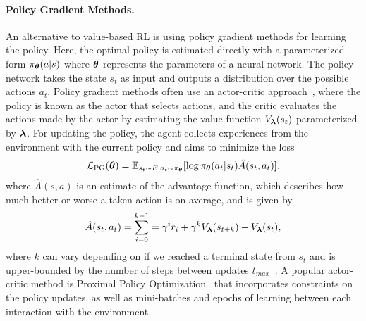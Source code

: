 \paragraph{Policy Gradient Methods.} An alternative to value-based RL is using policy gradient methods for learning the policy. Here, the optimal policy is estimated directly with a parameterized form $\pi_{{\bm{\theta}}}(a | s)$ where ${\bm{\theta}}$ represents the parameters of a neural network. The policy network takes the state $s_t$ as input and outputs a distribution over the possible actions $a_t$. Policy gradient methods often use an actor-critic approach~\cite{sutton2018reinforcement,konda1999actor}, where the policy is known as the actor that selects actions, and the critic evaluates the actions made by the actor by estimating the value function $V_{{\bm{\lambda}}}(s_{t})$ parameterized by ${{\bm{\lambda}}}$. 
For updating the policy, the agent collects experiences from the environment with the current policy and aims to minimize the loss 
\begin{align}
	{\mathcal{L}}_{\text{PG}}({\bm{\theta}}) = \mathbb{E}_{s_t \sim E, a_t \sim \pi_{{\bm{\theta}}}}[\log \pi_{{\bm{\theta}}}(a_t | s_t) \hat{A}(s_t, a_t)],
\end{align}
where $\hat{A}(s, a)$ is an estimate of the advantage function, which describes how much better or worse a taken action is on average, and is given by 
\begin{align}
	\hat{A}(s_t, a_t) = \sum_{i=0}^{k-1} = \gamma^{i} r_i + \gamma^{k} V_{{\bm{\lambda}}}(s_{t+k}) - V_{{\bm{\lambda}}}(s_{t}) ,
\end{align}
where $k$ can vary depending on if we reached a terminal state from $s_t$ and is upper-bounded by the number of steps between updates $t_{max}$~\cite{mnih2016asynchronous}. A popular actor-critic method is Proximal Policy Optimization~\cite{schulman2017proximal} that incorporates constraints on the policy updates, as well as mini-batches and epochs of learning between each interaction with the environment. 


